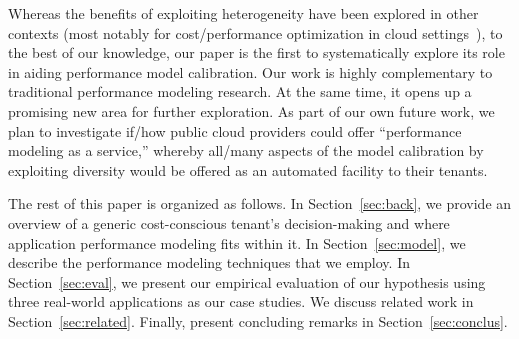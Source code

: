 Whereas the benefits of exploiting heterogeneity have been explored in other contexts (most notably for cost/performance optimization in cloud settings~\cite{DBLP:conf/cloud/ReissTGKK12,Zhang15,Farley:2012:MYM:2391229.2391249,DBLP:conf/hotcloud/LeeK11}), to the best of our knowledge, our paper is the first to systematically explore its role in aiding performance model calibration. %
Our work is highly complementary to traditional performance modeling research. At the same time, it opens up a promising new area for further exploration. As part of our own future work, we plan to investigate if/how public cloud providers could offer ``performance modeling as a service,'' whereby all/many aspects of the model calibration by exploiting diversity would be offered as an automated facility to their tenants. 



The rest of this paper is organized as follows. In Section~\ref{sec:back}, we provide an overview of a generic cost-conscious tenant's decision-making and where application performance modeling fits within it.  In Section~\ref{sec:model}, we describe the performance modeling techniques that we employ.  In Section~\ref{sec:eval}, we present our empirical evaluation of our hypothesis using three real-world applications as our case studies. We discuss related work in Section~\ref{sec:related}.  Finally, %
present concluding remarks in Section~\ref{sec:conclus}. 
 


 

